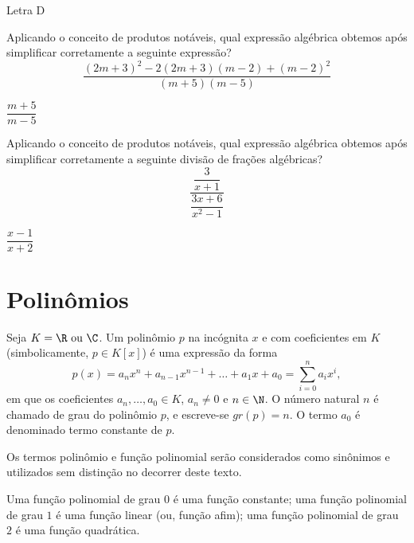 \begin{resp}
 Letra D
\end{resp}

\begin{exer}
Aplicando o conceito de produtos notáveis, qual expressão algébrica obtemos após simplificar corretamente a seguinte expressão?
\[\dfrac{(2m+3)^2-2(2m+3)(m-2)+(m-2)^2}{(m+5)(m-5)}\]
\end{exer}

\begin{resp}
 $\dfrac{m+5}{m-5}$
\end{resp}

\begin{exer}
Aplicando o conceito de produtos notáveis, qual expressão algébrica obtemos após simplificar corretamente a seguinte divisão de frações algébricas?
\[\dfrac{\dfrac{3}{x+1}}{\dfrac{3x+6}{x^2-1}}\]
\end{exer}

\begin{resp}
 $\dfrac{x-1}{x+2}$
\end{resp}

\construirExer

 
 \chapter{Polinômios}

  \vskip0.3cm
 \colorbox{azul}{
 \begin{minipage}{0.9\linewidth}
 \begin{center}
  Seja $K= \R \text{ ou } \C$. Um polinômio $p$ na incógnita $x$ e com coeficientes em $K$ (simbolicamente, $p \in K[x]$) é uma expressão da forma
\begin{equation}
p(x)= a_nx^n + a_{n-1}x^{n-1}+ \ldots + a_1x+ a_0= \sum_{i=0}^{n} a_ix^i ,
\end{equation}
  em que os coeficientes $a_n, \ldots, a_0 \in K$, $a_n \neq 0$ e $n \in \N$. O número natural $n$ é chamado de grau do polinômio $p$, e escreve-se $gr(p)= n$. O termo $a_0$ é denominado termo constante de $p$.
 \end{center}
 \end{minipage}}
 \vskip0.3cm

 \begin{obs}
 Os termos polinômio e função polinomial serão considerados como sinônimos e utilizados sem distinção no decorrer deste texto.
 \end{obs}

 Uma função polinomial de grau $0$ é uma função constante; uma função polinomial de grau $1$ é uma função linear (ou, função afim); uma função polinomial de grau $2$ é uma função quadrática.

